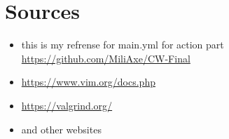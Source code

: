 \documentclass[titlepage]{article}
\begin{document}
\section*{Sources}
\begin{itemize}
    \item this is my refrense for main.yml for action part \url{https://github.com/MiliAxe/CW-Final}
    \item \url{https://www.vim.org/docs.php}
    \item \url{https://valgrind.org/}
    \item and other websites
\end{itemize}
\end{document}
